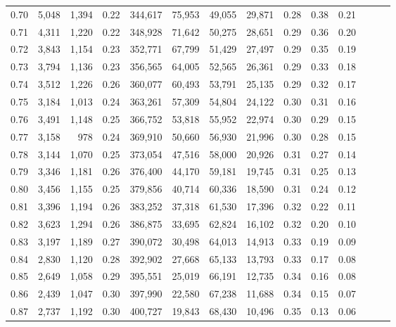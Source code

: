 \begin{tabular}{rrrrrrrrrrrrrr}
0.70 &   5,048 &  1,394 &  0.22 &  344,617 &   75,953 &  49,055 &  29,871 &  0.28 &  0.38 &      0.21 \\
0.71 &   4,311 &  1,220 &  0.22 &  348,928 &   71,642 &  50,275 &  28,651 &  0.29 &  0.36 &      0.20 \\
0.72 &   3,843 &  1,154 &  0.23 &  352,771 &   67,799 &  51,429 &  27,497 &  0.29 &  0.35 &      0.19 \\
0.73 &   3,794 &  1,136 &  0.23 &  356,565 &   64,005 &  52,565 &  26,361 &  0.29 &  0.33 &      0.18 \\
0.74 &   3,512 &  1,226 &  0.26 &  360,077 &   60,493 &  53,791 &  25,135 &  0.29 &  0.32 &      0.17 \\
0.75 &   3,184 &  1,013 &  0.24 &  363,261 &   57,309 &  54,804 &  24,122 &  0.30 &  0.31 &      0.16 \\
0.76 &   3,491 &  1,148 &  0.25 &  366,752 &   53,818 &  55,952 &  22,974 &  0.30 &  0.29 &      0.15 \\
0.77 &   3,158 &    978 &  0.24 &  369,910 &   50,660 &  56,930 &  21,996 &  0.30 &  0.28 &      0.15 \\
0.78 &   3,144 &  1,070 &  0.25 &  373,054 &   47,516 &  58,000 &  20,926 &  0.31 &  0.27 &      0.14 \\
0.79 &   3,346 &  1,181 &  0.26 &  376,400 &   44,170 &  59,181 &  19,745 &  0.31 &  0.25 &      0.13 \\
0.80 &   3,456 &  1,155 &  0.25 &  379,856 &   40,714 &  60,336 &  18,590 &  0.31 &  0.24 &      0.12 \\
0.81 &   3,396 &  1,194 &  0.26 &  383,252 &   37,318 &  61,530 &  17,396 &  0.32 &  0.22 &      0.11 \\
0.82 &   3,623 &  1,294 &  0.26 &  386,875 &   33,695 &  62,824 &  16,102 &  0.32 &  0.20 &      0.10 \\
0.83 &   3,197 &  1,189 &  0.27 &  390,072 &   30,498 &  64,013 &  14,913 &  0.33 &  0.19 &      0.09 \\
0.84 &   2,830 &  1,120 &  0.28 &  392,902 &   27,668 &  65,133 &  13,793 &  0.33 &  0.17 &      0.08 \\
0.85 &   2,649 &  1,058 &  0.29 &  395,551 &   25,019 &  66,191 &  12,735 &  0.34 &  0.16 &      0.08 \\
0.86 &   2,439 &  1,047 &  0.30 &  397,990 &   22,580 &  67,238 &  11,688 &  0.34 &  0.15 &      0.07 \\
0.87 &   2,737 &  1,192 &  0.30 &  400,727 &   19,843 &  68,430 &  10,496 &  0.35 &  0.13 &      0.06 \\

\end{tabular}
